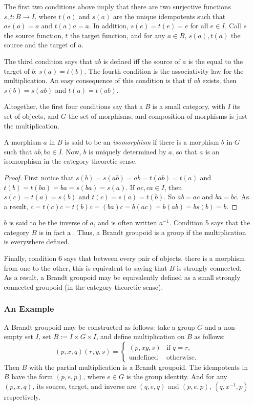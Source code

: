 \documentclass[12pt]{article}
\begin{document}
The first two conditions above imply that there are two surjective functions $s,t:B\to I$, where $t(a)$ and $s(a)$ are the unique idempotents such that $a s(a)=a$ and $t(a) a=a$.  In addition, $s(e)=t(e)=e$ for all $e\in I$.  Call $s$ the source function, $t$ the target function, and for any $a\in B$, $s(a),t(a)$ the source and the target of $a$.

The third condition says that $ab$ is defined iff the source of $a$ is the equal to the target of $b$: $s(a)=t(b)$.  The fourth condition is the associativity law for the multiplication.  An easy consequence of this condition is that if $ab$ exists, then $s(b)=s(ab)$ and $t(a)=t(ab)$.

Altogether, the first four conditions say that a $B$ is a small category, with $I$ its set of objects, and $G$ the set of morphisms, and composition of morphisms is just the multiplication.

A morphism $a$ in $B$ is said to be an \emph{isomorphism} if there is a morphism $b$ in $G$ such that $ab,ba \in I$.  Now, $b$ is uniquely determined by $a$, so that $a$ is an isomorphism in the category theoretic sense.  
\begin{proof}
First notice that $s(b)=s(ab)=ab=t(ab)=t(a)$ and $t(b)=t(ba)=ba=s(ba)=s(a)$.  If $ac, ca \in I$, then $s(c)=t(a)=s(b)$ and $t(c)=s(a)=t(b)$.  So $ab=ac$ and $ba=bc$.  As a result, $c=t(c)c = t(b)c= (ba)c=b(ac)= b(ab)= b s(b)=b$.  
\end{proof}
$b$ is said to be the inverse of $a$, and is often written $a^{-1}$.  Condition 5 says that the category $B$ is in fact a .  Thus, a Brandt groupoid is a group if the multiplication is everywhere defined.

Finally, condition 6 says that between every pair of objects, there is a morphism from one to the other, this is equivalent to saying that $B$ is strongly connected.  As a result, a Brandt groupoid may be equivalently defined as a small strongly connected groupoid (in the category theoretic sense).

\subsubsection*{An Example}
A Brandt groupoid may be constructed as follows: take a group $G$ and a non-empty set $I$, set $B:=I\times G\times I$, and define multiplication on $B$ as follows:
\begin{displaymath}
(p,x,q)(r,y,s) = \left\{
\begin{array}{ll}
(p,xy,s) & \textrm{if }q=r,\\
\textrm{undefined} & \textrm{otherwise.}
\end{array}
\right.
\end{displaymath}
Then $B$ with the partial multiplication is a Brandt groupoid.  The idempotents in $B$ have the form $(p,e,p)$, where $e\in G$ is the group identity.  And for any $(p,x,q)$, its source, target, and inverse are $(q,e,q)$ and $(p,e,p)$, $(q,x^{-1},p)$ respectively.
\end{document}
